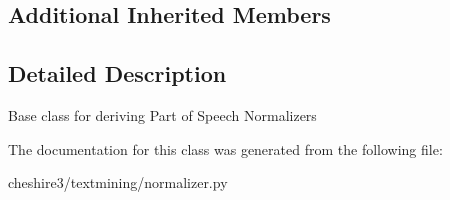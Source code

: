 \subsection*{Additional Inherited Members}


\subsection{Detailed Description}
\begin{DoxyVerb}Base class for deriving Part of Speech Normalizers \end{DoxyVerb}
 

The documentation for this class was generated from the following file\-:\begin{DoxyCompactItemize}
\item 
cheshire3/textmining/normalizer.\-py\end{DoxyCompactItemize}
